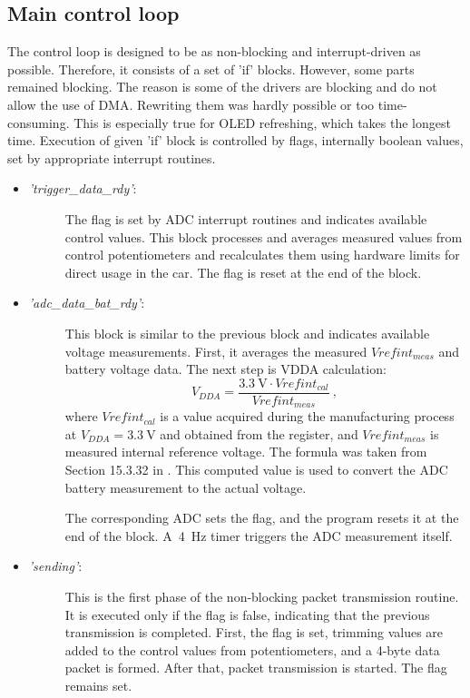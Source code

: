 \subsection{Main control loop}
The control loop is designed to be as non-blocking and interrupt-driven as possible. Therefore, it consists of a set of 'if' blocks. However, some parts remained blocking. The reason is some of the drivers are blocking and do not allow the use of DMA. Rewriting them was hardly possible or too time-consuming. This is especially true for OLED refreshing, which takes the longest time. Execution of given 'if' block is controlled by flags, internally boolean values, set by appropriate interrupt routines.
\newpage
\begin{itemize}
	\item \begin{description}
\item[\textit{'trigger\_data\_rdy'}:]
The flag is set by ADC interrupt routines and indicates available control values. This block processes and averages measured values from control potentiometers and recalculates them using hardware limits for direct usage in the car. The flag is reset at the end of the block.
\end{description}

	\item \begin{description}
\item[\textit{'adc\_data\_bat\_rdy'}:]
This block is similar to the previous block and indicates available voltage measurements.  First, it averages the measured $Vrefint_{meas}$ and battery voltage data. The next step is VDDA calculation:
\begin{equation}
	V_{DDA} = \frac{\SI{3.3}{\V} \cdot Vrefint_{cal}}{Vrefint_{meas}}\ ,
\end{equation}
where $Vrefint_{cal}$ is a value acquired during the manufacturing process at $V_{DDA} = \SI{3.3}{\V}$ and obtained from the register, and $Vrefint_{meas}$ is measured internal reference voltage. The formula was taken from Section 15.3.32 in \cite{f303_ref}. This computed value is used to convert the ADC battery measurement to the actual voltage.

The corresponding ADC sets the flag, and the program resets it at the end of the block. A~\SI{4}{\Hz} timer triggers the ADC measurement itself.
\end{description}

	\item \begin{description}
\item[\textit{'sending'}:]
This is the first phase of the non-blocking packet transmission routine. It is executed only if the flag is false, indicating that the previous transmission is completed. First, the flag is set, trimming values are added to the control values from potentiometers, and a 4-byte data packet is formed. After that, packet transmission is started. The flag remains set.
\end{description}


\end{itemize}
